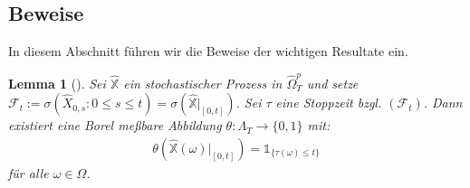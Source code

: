 \documentclass[12pt,titlepage,headsepline]{article}
\newtheorem*{lemma-non}{Lemma}
\begin{document}
      \subsection{Beweise}\label{appendix:beweise}
      In diesem Abschnitt führen wir die Beweise der wichtigen Resultate ein.

      \begin{lemma-non}[\cite{bayer_optimal_2020,Lemma 3.2}]
        Sei $\hat{\mathbb{X}}$ ein stochastischer Prozess in $\hat{\Omega}_T^p$ und setze $\mathcal{F}_t:=\sigma(\hat{X}_{0,s} : 0 \leq s \leq t) = \sigma(\hat{\mathbb{X}}\rvert_{[0,t]})$. Sei $\tau$ eine Stoppzeit bzgl. $(\mathcal{F}_t)$. Dann existiert eine Borel meßbare Abbildung $\theta: \Lambda_T \rightarrow \{0,1\}$ mit:
        \begin{align*}
          \theta(\hat{\mathbb{X}}(\omega)\rvert_{[0,t]})=\mathds{1}_{\{\tau(\omega)\leq t\}}
        \end{align*}
        für alle $\omega \in \Omega$.
      \end{lemma-non}
\end{document}
